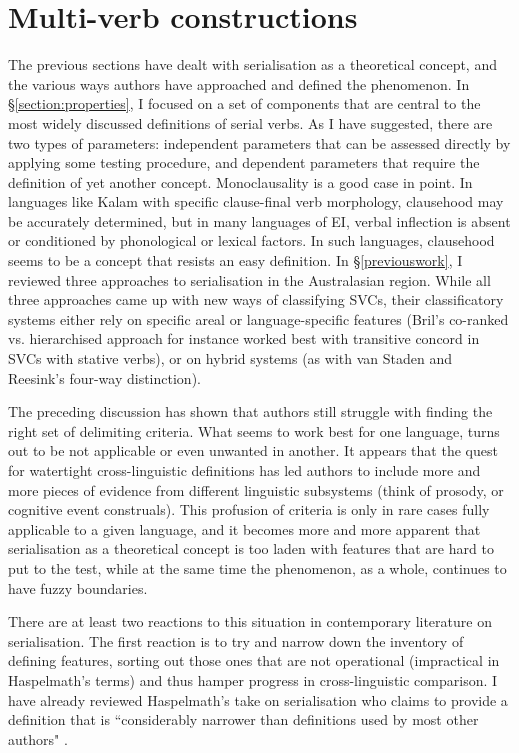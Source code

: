 \section{Multi-verb constructions} \label{section:multi-verbconstructions}

The previous sections have dealt with serialisation as a theoretical concept, and the various ways authors have approached and defined the phenomenon. In §\ref{section:properties}, I focused on a set of components that are central to the most widely discussed definitions of serial verbs. As I have suggested, there are two types of parameters: independent parameters that can be assessed directly by applying some testing procedure, and dependent parameters that require the definition of yet another concept. Monoclausality is a good case in point. In languages like Kalam with specific clause-final verb morphology, clausehood may be accurately determined, but in many languages of EI, verbal inflection is absent or conditioned by phonological or lexical factors. In such languages, clausehood seems to be a concept that resists an easy definition. In §\ref{previouswork}, I reviewed three approaches to serialisation in the Australasian region. While all three approaches came up with new ways of classifying SVCs, their classificatory systems either rely on specific areal or language-specific features (Bril's co-ranked vs. hierarchised approach for instance worked best with transitive concord in SVCs with stative verbs), or on hybrid systems (as with van Staden and Reesink's four-way distinction).

The preceding discussion has shown that authors still struggle with finding the right set of delimiting criteria. What seems to work best for one language, turns out to be not applicable or even unwanted in another. It appears that the quest for watertight cross-linguistic definitions has led authors to include more and more pieces of evidence from different linguistic subsystems (think of prosody, or cognitive event construals). This profusion of criteria is only in rare cases fully applicable to a given language, and it becomes more and more apparent that serialisation as a theoretical concept is too laden with features that are hard to put to the test, while at the same time the phenomenon, as a whole, continues to have fuzzy boundaries. 

There are at least two reactions to this situation in contemporary literature on serialisation. The first reaction is to try and narrow down the inventory of defining features, sorting out those ones that are not operational (impractical in Haspelmath's terms) and thus hamper progress in cross-linguistic comparison. I have already reviewed Haspelmath's take on serialisation who claims to provide a definition that is ``considerably narrower than definitions used by most other authors" \citep[6]{haspelmath2016serial}. 

